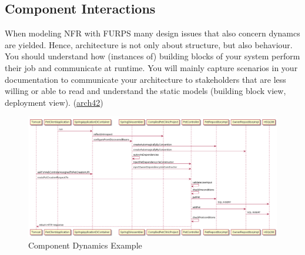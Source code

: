 \documentclass[../Main.tex]{subfiles}
\begin{document}
\newpage
\subsection{Component Interactions}
When modeling NFR with FURPS many design issues that also
concern dynamcs are yielded. Hence, architecture is not only
about structure, but also behaviour.
You should understand how (instances of) building blocks of
your system perform their job and communicate at runtime.
You will mainly capture scenarios in your documentation
to communicate your architecture to stakeholders that are
less willing or able to read and understand the static models
(building block view, deployment view). (\href{http://docs.arc42.org/section-6/}{arch42})

\begin{figure}[H]
    \centering
    \includegraphics[width=1\linewidth]{Images/component-dynamics.png}
    \caption{Component Dynamics Example}
\end{figure}
\newpage

\newpage
\end{document}
